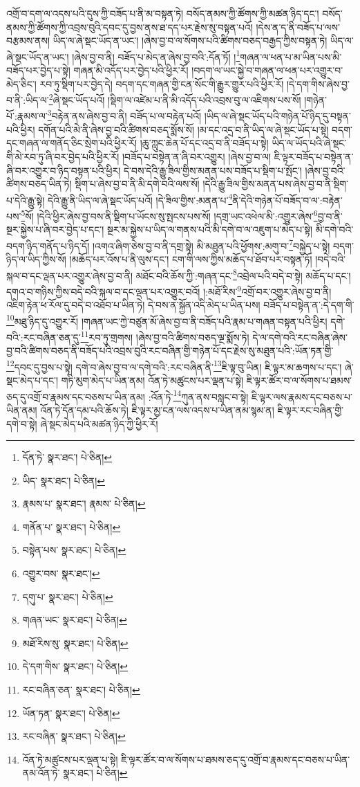 འགྲོ་བ་དག་ལ་འདས་པའི་དུས་ཀྱི་བཟོད་པ་ནི་མ་བསྟན་ཏེ། བསོད་ནམས་ཀྱི་ཚོགས་ཀྱི་མཚན་ཉིད་དང་། བསོད་ནམས་ཀྱི་ཚོགས་ཀྱི་འབྲས་བུའི་དབང་དུ་བྱས་ནས་ཐ་དད་པར་རྗེས་སུ་བསྟན་པའོ། །དེས་ན་ད་ནི་བཟོད་པ་ལས་བརྩམས་ནས། ཡིད་ལ་ཞེ་སྡང་ཡོད་ན་ཡང་། །ཞེས་བྱ་བ་ལ་སོགས་པའི་ཚིགས་བཅད་བརྒྱད་ཀྱིས་བསྟན་ཏེ། ཡིད་ལ་ཞེ་སྡང་ཡོད་ན་ཡང་། །ཞེས་བྱ་བ་ནི། བཟོད་པ་མེད་ན་ཞེས་བྱ་བའི་:དོན་ཏོ། །\footnote{དོན་ཏེ་  སྣར་ཐང་།  པེ་ཅིན། }གཞན་ལ་ཕན་པ་མ་ཡིན་པས་མི་བཟོད་པར་བྱེད་པ་སྟེ། གཞན་མི་འདོད་པར་བྱེད་པའི་ཕྱིར་རོ། །བདག་ལ་ཡང་སྐྱེ་བ་གཞན་ལ་ཕན་པར་འགྱུར་བ་མེད་ཅིང་། རབ་ཏུ་སྡིག་པར་བྱེད་དེ། བདག་དང་གཞན་གྱི་ངན་སོང་གི་རྒྱུར་གྱུར་པའི་ཕྱིར་རོ། །དེ་དག་གིས་ཞེས་བྱ་བ་ནི་:ཡིད་ལ་\footnote{ཡིད་  སྣར་ཐང་།  པེ་ཅིན། }ཞེ་སྡང་ཡོད་པའོ། །སྡིག་ལ་འཛེམ་པ་ནི་མི་འདོད་པའི་འབྲས་བུ་ལ་འཇིགས་པས་སོ། །གཉེན་པོ་:རྣམས་ལ་\footnote{རྣམས་པ་  སྣར་ཐང་། རྣམས་  པེ་ཅིན། }བརྟེན་ནས་ཞེས་བྱ་བ་ནི། བཟོད་པ་ལ་བརྟེན་པའོ། །ཡིད་ལ་ཞེ་སྡང་ཡོད་པའི་གཉེན་པོ་ཉིད་དུ་བསྟན་པའི་ཕྱིར། དགོན་པའི་མེ་ནི་ཞེས་བྱ་བའི་ཚིགས་བཅད་སྨོས་སོ། །མ་དང་འདྲ་བ་ནི་ཡིད་ལ་ཞེ་སྡང་ཡོད་པ་སྟེ། བདག་དང་གཞན་ལ་གནོད་ཅིང་སྲེག་པའི་ཕྱིར་རོ། །ཆུ་ཀླུང་ཆེན་པོ་དང་འདྲ་བ་ནི་བཟོད་པ་སྟེ། ཡིད་ལ་ཡོད་པའི་ཞེ་སྡང་གི་མེ་རབ་ཏུ་ཞི་བར་བྱེད་པའི་ཕྱིར་རོ། །བཟོད་པ་བསྟེན་ན་ཞི་བར་འགྱུར། །ཞེས་བྱ་བ་ལ། ཇི་ལྟར་བཟོད་པ་བསྟེན་ན་ཞི་བར་འགྱུར་བ་ཉིད་བསྟན་པའི་ཕྱིར། དེ་བས་དེའི་རྒྱུ་ཟིལ་གྱིས་མནན་པས་བཟོད་པ་སྡིག་པ་སྤོང་། །ཞེས་བྱ་བའི་ཚིགས་བཅད་ཡིན་ཏེ། སྡིག་པ་ཞེས་བྱ་བ་ནི་མི་དགེ་བའི་ལས་སོ། །དེའི་རྒྱུ་ཟིལ་གྱིས་མནན་པས་ཞེས་བྱ་བ་ནི་སྡིག་པ་དེའི་རྒྱུ་སྟེ། དེའི་རྒྱུ་ནི་ཡིད་ལ་ཞེ་སྡང་ཡོད་པའོ། །དེ་ཟིལ་གྱིས་:མནན་པ་\footnote{གནོན་པ་  སྣར་ཐང་།  པེ་ཅིན། }ནི་དེའི་གཉེན་པོ་བཟོད་བ་ལ་:བརྟེན་པས་\footnote{བསྟེན་པས་  སྣར་ཐང་།  པེ་ཅིན། }སོ། །དེའི་ཕྱིར་ཞེས་བྱ་བས་ནི་སྡིག་པ་ཡོངས་སུ་སྤངས་པས་སོ། །དགྲ་ཡང་འཕེལ་མི་:འགྱུར་ཞེས་\footnote{འགྱུར་བས་  སྣར་ཐང་། }བྱ་བ་ནི་སྔར་སྐྱེས་པ་ཞི་བར་བྱེད་པ་དང་། སྔར་མ་སྐྱེས་པ་ཡིད་ལ་གནས་པའི་མི་དགེ་བ་ལ་འཇུག་པ་མེད་པ་སྟེ། མི་དགེ་བའི་བདག་ཉིད་གནོད་པ་ཉིད་དོ། །འགའ་ཞིག་ཅེས་བྱ་བ་ནི་དགྲ་སྟེ། མི་མཐུན་པའི་ཕྱོགས་:མགུ་བ་\footnote{དགུ་པ་  སྣར་ཐང་།  པེ་ཅིན། }བསྐྱེད་པ་སྟེ། བདག་ཉིད་ལ་ཡིད་ཀྱིས་སོ། །མཆོད་པར་འོས་པ་ནི་ལུས་དང་། ངག་གི་ལས་ཀྱིས་མཆོད་པ་ཐོབ་པར་བསྟན་ཏོ། །བདེ་བའི་སྐལ་བ་དང་ལྡན་པར་འགྱུར་ཞེས་བྱ་བ་ནི། མཐོང་བའི་ཆོས་ཀྱི་:གཞན་དང་\footnote{གཞན་ཡང་  སྣར་ཐང་།  པེ་ཅིན། }འབྲེལ་པའི་བདེ་བ་སྟེ། མཆོད་པ་དང་། དགའ་བ་གཉིས་ཀྱིས་བདེ་བའི་སྐལ་བ་དང་ལྡན་པར་འགྱུར་བའོ། །:མཐོ་རིས་\footnote{མཐོ་རིས་སུ་  སྣར་ཐང་།  པེ་ཅིན། }འགྲོ་བར་འགྱུར་ཞེས་བྱ་བ་ནི། འཇིག་རྟེན་ཕ་རོལ་དུ་བདེ་བ་འཐོབ་པ་ཡིན་ཏེ། དེ་བས་ན་སྐྱོན་འདི་མེད་པ་ཡིན་པས། བཟོད་པ་བསྟེན་ན་:དེ་དག་གི་\footnote{དེ་དག་གིས་  སྣར་ཐང་།  པེ་ཅིན། }མཐུ་ཉིད་དུ་འགྱུར་རོ། །གཞན་ཡང་ཀྱེ་བཙུན་མོ་ཞེས་བྱ་བ་ནི་བཟོད་པའི་རྣམ་པ་གཞན་བསྟན་པའི་ཕྱིར། དགེ་བའི་:རང་བཞིན་ཅན་དུ་\footnote{རང་བཞིན་ཅན་  སྣར་ཐང་།  པེ་ཅིན། }རབ་ཏུ་གྲགས། །ཞེས་བྱ་བའི་ཚིགས་བཅད་ལྔ་སྨོས་ཏེ། དེ་ལ་དགེ་བའི་རང་བཞིན་ཞེས་བྱ་བའི་ཚིགས་བཅད་ནི་བཟོད་པའི་འབྲས་བུའི་རང་བཞིན་གྱི་གཉེན་པོ་དང་རྗེས་སུ་མཐུན་པའི་:ཡོན་ཏན་གྱི་\footnote{ཡོན་ཏན་  སྣར་ཐང་།  པེ་ཅིན། }དབང་དུ་བྱས་པ་སྟེ། དགེ་བ་ཞེས་བྱ་བ་ལ་དགེ་བའི་:རང་བཞིན་ནི་\footnote{རང་བཞིན་  སྣར་ཐང་།  པེ་ཅིན། }ཇི་ལྟ་བུ་ཡིན། ཇི་ལྟར་མ་ཆགས་པ་དང་། ཞེ་སྡང་མེད་པ་དང་། གཏི་མུག་མེད་པ་ཡིན་ནམ། འོན་ཏེ་མཚུངས་པར་ལྡན་པ་སྟེ། ཇི་ལྟར་ཚོར་བ་ལ་སོགས་པ་ཐམས་ཅད་དུ་འགྲོ་བ་རྣམས་དང་བཅས་པ་ཡིན་ནམ། :འོན་ཏེ་\footnote{འོན་ཏེ་མཚུངས་པར་ལྡན་པ་སྟེ། ཇི་ལྟར་ཚོར་བ་ལ་སོགས་པ་ཐམས་ཅད་དུ་འགྲོ་བ་རྣམས་དང་བཅས་པ་ཡིན་ནམ་འོན་ཏེ་  སྣར་ཐང་།  པེ་ཅིན། }ཀུན་ནས་བསླང་བ་སྟེ། ཇི་ལྟར་ལས་རྣམས་དང་བཅས་པ་ཡིན་ནམ། འོན་ཏེ་དོན་དམ་པའི་ཆོས་ཏེ། ཇི་ལྟར་མྱ་ངན་ལས་འདས་པ་ཡིན་ནམ་སྙམ་ན། ཇི་ལྟར་རང་བཞིན་གྱི་དགེ་བ་སྟེ། ཞེ་སྡང་མེད་པའི་མཚན་ཉིད་ཀྱི་ཕྱིར་རོ། 